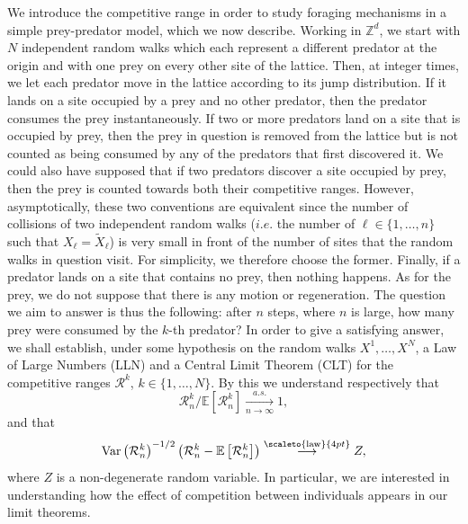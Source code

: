 \documentclass[12pt]{article}
\newcommand{\R}{\mathcal R}
\newcommand{\EE}{\mathbb E}
\newcommand{\1}{\mathds{1}}
\newcommand{\ZZ}{\mathbb Z}
\newcommand{\distribution}{\stackrel{\scaleto{\mathrm{law}}{4pt}}{\longrightarrow}}
\newcommand{\Var}{\mathrm{Var}}
\numberwithin{equation}{section}
\begin{document}
We introduce the competitive range in order to study foraging mechanisms in a simple prey-predator model, which we now describe. Working in $\ZZ^d$, we start with $N$ independent random walks which each represent a different predator at the origin and with one prey on every other site of the lattice. Then, at integer times, we let each predator move in the lattice according to its jump distribution. If it lands on a site occupied by a prey and no other predator, then the predator consumes the prey instantaneously. If two or more predators land on a site that is occupied by prey, then the prey in question is removed from the lattice but is not counted as being consumed by any of the predators that first discovered it. We could also have supposed that if two predators discover a site occupied by prey, then the prey is counted towards both their competitive ranges. However, asymptotically, these two conventions are equivalent since the number of collisions of two independent random walks ($i.e.$ the number of $\ell\in\{1,\dots,n\}$ such that $X_\ell=\widetilde X_\ell$) is very small in front of the number of sites that the random walks in question visit. For simplicity, we therefore choose the former. Finally, if a predator lands on a site that contains no prey, then nothing happens. As for the prey, we do not suppose that there is any motion or regeneration. The question we aim to answer is thus the following: after $n$ steps, where $n$ is large, how many prey were consumed by the $k$-th predator? In order to give a satisfying answer, we shall establish, under some hypothesis on the random walks $X^1,\dots, X^N$, a Law of Large Numbers (LLN) and a Central Limit Theorem (CLT) for the competitive ranges $\R^k$, $k\in\{1,\dots,N\}$. By this we understand respectively that
\begin{equation*}
    \R_n^k/\EE\left[\R_n^k\right]\underset{n\rightarrow\infty}{\overset{a.s.}\longrightarrow}1,
\end{equation*} 
and that 
\begin{equation*}
    \Var\left(\R_n^k\right)^{-1/2}\left(\R_n^k-\EE\left[\R_n^k\right]\right)\distribution Z,
\end{equation*}
where $Z$ is a non-degenerate random variable. In particular, we are interested in understanding how the effect of competition between individuals appears in our limit theorems.
\end{document}
